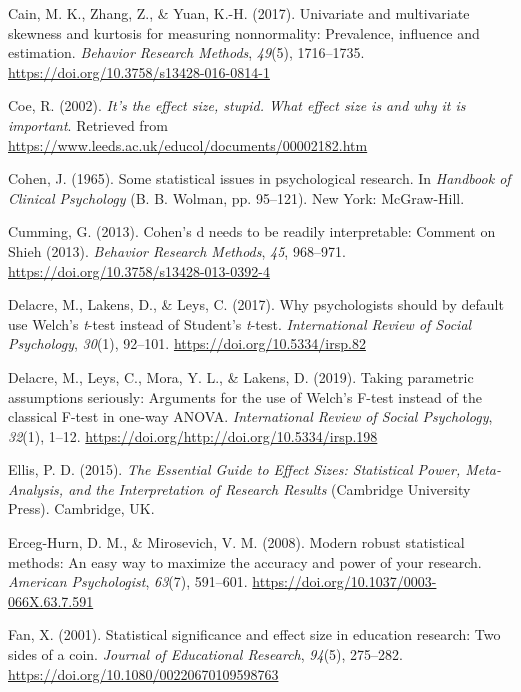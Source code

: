 \documentclass[
  english,
  man,floatsintext]{apa6}
\begin{document}
\leavevmode\hypertarget{ref-Cain_et_al_2017}{}%
Cain, M. K., Zhang, Z., \& Yuan, K.-H. (2017). Univariate and multivariate skewness and kurtosis for measuring nonnormality: Prevalence, influence and estimation. \emph{Behavior Research Methods}, \emph{49}(5), 1716--1735. \url{https://doi.org/10.3758/s13428-016-0814-1}

\leavevmode\hypertarget{ref-Coe_2002}{}%
Coe, R. (2002). \emph{It's the effect size, stupid. What effect size is and why it is important}. Retrieved from \url{https://www.leeds.ac.uk/educol/documents/00002182.htm}

\leavevmode\hypertarget{ref-Cohen_1965}{}%
Cohen, J. (1965). Some statistical issues in psychological research. In \emph{Handbook of Clinical Psychology} (B. B. Wolman, pp. 95--121). New York: McGraw-Hill.

\leavevmode\hypertarget{ref-Cumming_2013}{}%
Cumming, G. (2013). Cohen's d needs to be readily interpretable: Comment on Shieh (2013). \emph{Behavior Research Methods}, \emph{45}, 968--971. \url{https://doi.org/10.3758/s13428-013-0392-4}

\leavevmode\hypertarget{ref-Delacre_et_al_2017}{}%
Delacre, M., Lakens, D., \& Leys, C. (2017). Why psychologists should by default use Welch's \emph{t}-test instead of Student's \emph{t}-test. \emph{International Review of Social Psychology}, \emph{30}(1), 92--101. \url{https://doi.org/10.5334/irsp.82}

\leavevmode\hypertarget{ref-Delacre_et_al_2019}{}%
Delacre, M., Leys, C., Mora, Y. L., \& Lakens, D. (2019). Taking parametric assumptions seriously: Arguments for the use of Welch's F-test instead of the classical F-test in one-way ANOVA. \emph{International Review of Social Psychology}, \emph{32}(1), 1--12. \url{https://doi.org/http://doi.org/10.5334/irsp.198}

\leavevmode\hypertarget{ref-Ellis_2015}{}%
Ellis, P. D. (2015). \emph{The Essential Guide to Effect Sizes: Statistical Power, Meta-Analysis, and the Interpretation of Research Results} (Cambridge University Press). Cambridge, UK.

\leavevmode\hypertarget{ref-Erceg-Hurn_Mirosevich_2008}{}%
Erceg-Hurn, D. M., \& Mirosevich, V. M. (2008). Modern robust statistical methods: An easy way to maximize the accuracy and power of your research. \emph{American Psychologist}, \emph{63}(7), 591--601. \url{https://doi.org/10.1037/0003-066X.63.7.591}

\leavevmode\hypertarget{ref-Fan_2001}{}%
Fan, X. (2001). Statistical significance and effect size in education research: Two sides of a coin. \emph{Journal of Educational Research}, \emph{94}(5), 275--282. \url{https://doi.org/10.1080/00220670109598763}
\end{document}
